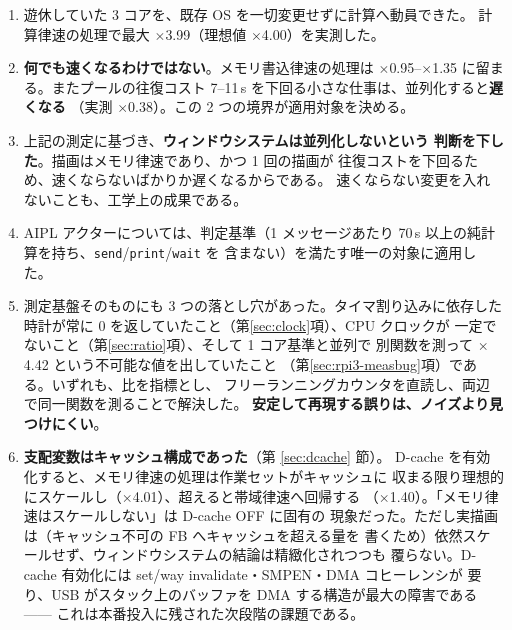 \documentclass[11pt,a4paper]{article}
\newcommand{\spd}[1]{$\times$#1}
\begin{document}
\begin{enumerate}[leftmargin=1.6em]
  \item 遊休していた 3 コアを、既存 OS を一切変更せずに計算へ動員できた。
        計算律速の処理で最大 \spd{3.99}（理想値 \spd{4.00}）を実測した。

  \item \textbf{何でも速くなるわけではない}。メモリ書込律速の処理は
        \spd{0.95}--\spd{1.35} に留まる。またプールの往復コスト
        7--11\,\textmu s を下回る小さな仕事は、並列化すると\textbf{遅くなる}
        （実測 \spd{0.38}）。この 2 つの境界が適用対象を決める。

  \item 上記の測定に基づき、\textbf{ウィンドウシステムは並列化しないという
        判断を下した}。描画はメモリ律速であり、かつ 1 回の描画が
        往復コストを下回るため、速くならないばかりか遅くなるからである。
        速くならない変更を入れないことも、工学上の成果である。

  \item AIPL アクターについては、判定基準（1 メッセージあたり 70\,\textmu s
        以上の純計算を持ち、\texttt{send}/\texttt{print}/\texttt{wait} を
        含まない）を満たす唯一の対象に適用した。

  \item 測定基盤そのものにも 3 つの落とし穴があった。タイマ割り込みに依存した
        時計が常に 0 を返していたこと（第\ref{sec:clock}項）、CPU クロックが
        一定でないこと（第\ref{sec:ratio}項）、そして 1 コア基準と並列で
        別関数を測って \spd{4.42} という不可能な値を出していたこと
        （第\ref{sec:rpi3-measbug}項）である。いずれも、比を指標とし、
        フリーランニングカウンタを直読し、両辺で同一関数を測ることで解決した。
        \textbf{安定して再現する誤りは、ノイズより見つけにくい}。

  \item \textbf{支配変数はキャッシュ構成であった}（第 \ref{sec:dcache} 節）。
        D-cache を有効化すると、メモリ律速の処理は作業セットがキャッシュに
        収まる限り理想的にスケールし（\spd{4.01}）、超えると帯域律速へ回帰する
        （\spd{1.40}）。「メモリ律速はスケールしない」は D-cache OFF に固有の
        現象だった。ただし実描画は（キャッシュ不可の FB へキャッシュを超える量を
        書くため）依然スケールせず、ウィンドウシステムの結論は精緻化されつつも
        覆らない。D-cache 有効化には set/way invalidate・SMPEN・DMA コヒーレンシが
        要り、USB がスタック上のバッファを DMA する構造が最大の障害である——
        これは本番投入に残された次段階の課題である。
\end{enumerate}
\end{document}
